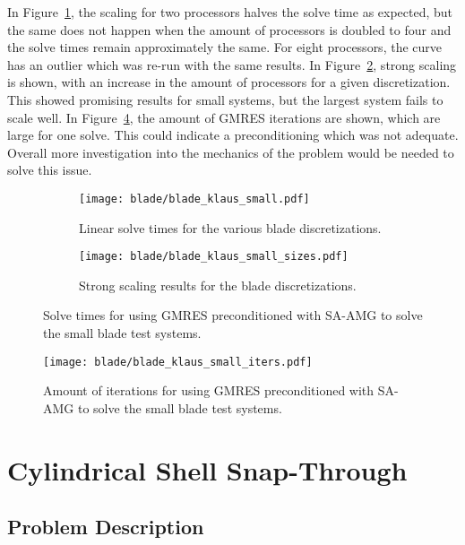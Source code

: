 In Figure~\ref{fig:blade11}, the scaling for two processors halves the solve time as expected, but the same does not happen when the amount of processors is doubled to four and the solve times remain approximately the same. For eight processors, the curve has an outlier which was re-run with the same results. In Figure~\ref{fig:blade12}, strong scaling is shown, with an increase in the amount of processors for a given discretization. This showed promising results for small systems, but the largest system fails to scale well. In Figure~\ref{fig:blade2}, the amount of GMRES iterations are shown, which are large for one solve. This could indicate a preconditioning which was not adequate. Overall more investigation into the mechanics of the problem would be needed to solve this issue.

\begin{figure}[ht]
    \begin{subfigure}{\columnwidth}
        \centering
        \texttt{[image: blade/blade\_klaus\_small.pdf]}
        \caption{Linear solve times for the various blade discretizations.}
        \label{fig:blade11}
    \end{subfigure}
    \begin{subfigure}{\columnwidth}
        \centering
        \texttt{[image: blade/blade\_klaus\_small\_sizes.pdf]}
        \caption{Strong scaling results for the blade discretizations.}
        \label{fig:blade12}
    \end{subfigure}
    \caption{Solve times for using GMRES preconditioned with SA-AMG to solve the small blade test systems.}
    \label{fig:blade1}
\end{figure}

\begin{figure}[ht]
    \centering
    \texttt{[image: blade/blade\_klaus\_small\_iters.pdf]}
    \caption{Amount of iterations for using GMRES preconditioned with SA-AMG to solve the small blade test systems.}
    \label{fig:blade2}
\end{figure}

\clearpage

\section{Cylindrical Shell Snap-Through}
\subsection{Problem Description}

